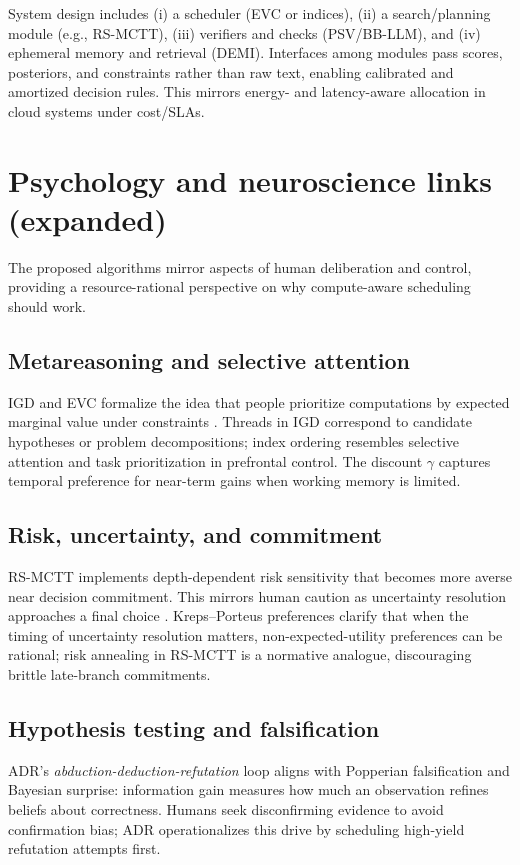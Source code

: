 System design includes (i) a scheduler (EVC or indices), (ii) a search/planning module (e.g., RS-MCTT), (iii) verifiers and checks (PSV/BB-LLM), and (iv) ephemeral memory and retrieval (DEMI). Interfaces among modules pass scores, posteriors, and constraints rather than raw text, enabling calibrated and amortized decision rules. This mirrors energy- and latency-aware allocation in cloud systems \cite{beloglazov2012cloud} under cost/SLAs.

\section{Psychology and neuroscience links (expanded)}

The proposed algorithms mirror aspects of human deliberation and control, providing a resource-rational perspective on why compute-aware scheduling should work.

\subsection{Metareasoning and selective attention}
IGD and EVC formalize the idea that people prioritize computations by expected marginal value under constraints \cite{liedergriffiths2020}. Threads in IGD correspond to candidate hypotheses or problem decompositions; index ordering resembles selective attention and task prioritization in prefrontal control. The discount $\gamma$ captures temporal preference for near-term gains when working memory is limited.

\subsection{Risk, uncertainty, and commitment}
RS-MCTT implements depth-dependent risk sensitivity that becomes more averse near decision commitment. This mirrors human caution as uncertainty resolution approaches a final choice \cite{howard1972risk}. Kreps–Porteus preferences \cite{kreps1978temporal} clarify that when the timing of uncertainty resolution matters, non-expected-utility preferences can be rational; risk annealing in RS-MCTT is a normative analogue, discouraging brittle late-branch commitments.

\subsection{Hypothesis testing and falsification}
ADR’s \emph{abduction-deduction-refutation} loop aligns with Popperian falsification and Bayesian surprise: information gain measures how much an observation refines beliefs about correctness. Humans seek disconfirming evidence to avoid confirmation bias; ADR operationalizes this drive by scheduling high-yield refutation attempts first.

